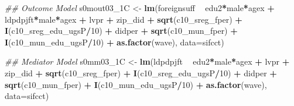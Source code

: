 \documentclass[
]{article}
\newenvironment{Shaded}{\begin{snugshade}}{\end{snugshade}}
\newcommand{\CommentTok}[1]{\textcolor[rgb]{0.56,0.35,0.01}{\textit{#1}}}
\newcommand{\DataTypeTok}[1]{\textcolor[rgb]{0.13,0.29,0.53}{#1}}
\newcommand{\DecValTok}[1]{\textcolor[rgb]{0.00,0.00,0.81}{#1}}
\newcommand{\KeywordTok}[1]{\textcolor[rgb]{0.13,0.29,0.53}{\textbf{#1}}}
\newcommand{\NormalTok}[1]{#1}
\newcommand{\OperatorTok}[1]{\textcolor[rgb]{0.81,0.36,0.00}{\textbf{#1}}}
\newcommand{\StringTok}[1]{\textcolor[rgb]{0.31,0.60,0.02}{#1}}
\begin{document}
\begin{Shaded}
\begin{Highlighting}[]
\CommentTok{## Outcome Model }
\NormalTok{s0mout03_1C <-}\StringTok{ }\KeywordTok{lm}\NormalTok{(foreignsuff  }\OperatorTok{~}\StringTok{ }\NormalTok{edu2}\OperatorTok{*}\NormalTok{male}\OperatorTok{*}\NormalTok{agex }\OperatorTok{+}\StringTok{ }\NormalTok{ldpdpjft}\OperatorTok{*}\NormalTok{male}\OperatorTok{*}\NormalTok{agex }\OperatorTok{+}\StringTok{ }\NormalTok{lvpr }\OperatorTok{+}\StringTok{  }
\StringTok{                    }\NormalTok{zip_did }\OperatorTok{+}\StringTok{ }\KeywordTok{sqrt}\NormalTok{(c10_sreg_fper) }\OperatorTok{+}\StringTok{ }\KeywordTok{I}\NormalTok{(c10_sreg_edu_ugsP}\OperatorTok{/}\DecValTok{10}\NormalTok{) }\OperatorTok{+}\StringTok{ }
\StringTok{                    }\NormalTok{didper }\OperatorTok{+}\StringTok{ }\KeywordTok{sqrt}\NormalTok{(c10_mun_fper) }\OperatorTok{+}\StringTok{ }\KeywordTok{I}\NormalTok{(c10_mun_edu_ugsP}\OperatorTok{/}\DecValTok{10}\NormalTok{) }\OperatorTok{+}\StringTok{ }
\StringTok{                    }\KeywordTok{as.factor}\NormalTok{(wave), }\DataTypeTok{data=}\NormalTok{sifcct)}

\CommentTok{## Mediator Model}
\NormalTok{s0mm03_1C <-}\StringTok{ }\KeywordTok{lm}\NormalTok{(ldpdpjft }\OperatorTok{~}\StringTok{ }\NormalTok{edu2}\OperatorTok{*}\NormalTok{male}\OperatorTok{*}\NormalTok{agex }\OperatorTok{+}\StringTok{ }\NormalTok{lvpr }\OperatorTok{+}\StringTok{  }
\StringTok{                  }\NormalTok{zip_did }\OperatorTok{+}\StringTok{ }\KeywordTok{sqrt}\NormalTok{(c10_sreg_fper) }\OperatorTok{+}\StringTok{ }\KeywordTok{I}\NormalTok{(c10_sreg_edu_ugsP}\OperatorTok{/}\DecValTok{10}\NormalTok{) }\OperatorTok{+}\StringTok{ }
\StringTok{                  }\NormalTok{didper }\OperatorTok{+}\StringTok{ }\KeywordTok{sqrt}\NormalTok{(c10_mun_fper) }\OperatorTok{+}\StringTok{ }\KeywordTok{I}\NormalTok{(c10_mun_edu_ugsP}\OperatorTok{/}\DecValTok{10}\NormalTok{) }\OperatorTok{+}\StringTok{ }
\StringTok{                  }\KeywordTok{as.factor}\NormalTok{(wave), }\DataTypeTok{data=}\NormalTok{sifcct)}


\end{Highlighting}
\end{Shaded}
\end{document}
